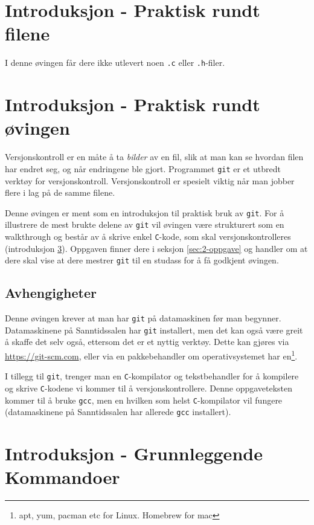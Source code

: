 \begin{alphasection}
\section{Introduksjon - Praktisk rundt filene}

I denne øvingen får dere ikke utlevert noen \verb|.c| eller \verb|.h|-filer.


\section{Introduksjon - Praktisk rundt øvingen}
Versjonskontroll er en måte å ta \textit{bilder} av en fil, slik at man kan se hvordan filen har endret seg, og når endringene ble gjort. Programmet \verb|git| er et utbredt verktøy for versjonskontroll. Versjonskontroll er spesielt viktig når man jobber flere i lag på de samme filene.

Denne øvingen er ment som en introduksjon til praktisk bruk av \verb|git|. For å illustrere de mest brukte delene av \verb|git| vil øvingen være strukturert som en walkthrough og består av å skrive enkel \verb|C|-kode, som skal versjonskontrolleres (introduksjon \ref{sec:innføring}). Oppgaven finner dere i seksjon \ref{sec:2-oppgave} og handler om at dere skal vise at dere mestrer \verb|git| til en studass for å få godkjent øvingen.

\subsection{Avhengigheter}

Denne øvingen krever at man har \verb|git| på datamaskinen før man begynner. Datamaskinene på Sanntidssalen har \verb|git| installert, men det kan også være greit å skaffe det selv også, ettersom det er et nyttig verktøy. Dette kan gjøres via \href{https://git-scm.com/downloads}{https://git-scm.com}, eller via en pakkebehandler om operativsystemet har en\footnote{apt, yum, pacman etc for Linux. Homebrew for mac}.

I tillegg til \verb|git|, trenger man en \verb|C|-kompilator og tekstbehandler for å kompilere og skrive \verb|C|-kodene vi kommer til å versjonskontrollere. Denne oppgaveteksten kommer til å bruke \verb|gcc|, men en hvilken som helst \verb|C|-kompilator vil fungere (datamaskinene på Sanntidssalen har allerede \verb|gcc| installert).


\section{Introduksjon - Grunnleggende Kommandoer}\label{sec:innføring}


\end{alphasection}
